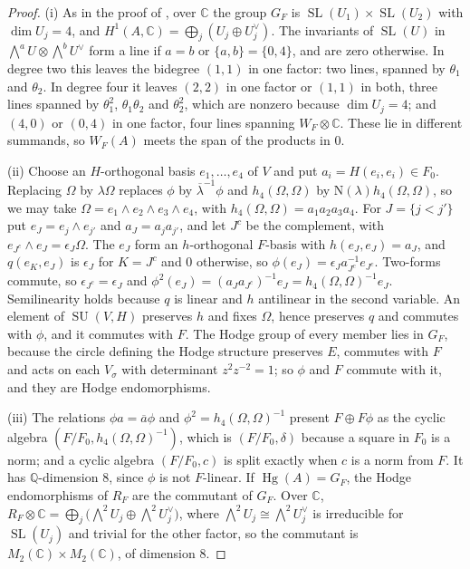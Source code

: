 \documentclass[11pt,reqno]{amsart}
\theoremstyle{plain}
\theoremstyle{definition}
\theoremstyle{remark}
\newcommand{\QQ}{\mathbb{Q}}
\newcommand{\CC}{\mathbb{C}}
\newcommand{\Nm}{\mathrm{N}}             %
\DeclareMathOperator{\Hg}{Hg}
\DeclareMathOperator{\SL}{SL}
\DeclareMathOperator{\SU}{SU}
\newcommand{\bbar}[1]{\overline{#1}}
\begin{document}
\begin{proof}
(i) As in the proof of \cite[Proposition~17.3(iii)]{paperI}, over $\CC$ the group $G_{F}$
is $\SL(U_{1})\times\SL(U_{2})$ with $\dim U_{j}=4$, and
$H^{1}(A,\CC)=\bigoplus_{j}(U_{j}\oplus U_{j}^{\vee})$. The invariants of
$\SL(U)$ in $\bigwedge^{a}U\otimes\bigwedge^{b}U^{\vee}$ form a line if $a=b$
or $\{a,b\}=\{0,4\}$, and are zero otherwise. In degree two this leaves the
bidegree $(1,1)$ in one factor: two lines, spanned by $\theta_{1}$ and
$\theta_{2}$. In degree four it leaves $(2,2)$ in one factor or $(1,1)$ in
both, three lines spanned by $\theta_{1}^{2}$, $\theta_{1}\theta_{2}$ and
$\theta_{2}^{2}$, which are nonzero because $\dim U_{j}=4$; and $(4,0)$ or
$(0,4)$ in one factor, four lines spanning $W_{F}\otimes\CC$. These lie in
different summands, so $W_{F}(A)$ meets the span of the products in $0$.

(ii) Choose an $H$-orthogonal basis $e_{1},\dots,e_{4}$ of $V$ and put
$a_{i}=H(e_{i},e_{i})\in F_{0}$. Replacing $\Omega$ by $\lambda\Omega$
replaces $\phi$ by $\bbar\lambda^{-1}\phi$ and $h_{4}(\Omega,\Omega)$ by
$\Nm(\lambda)h_{4}(\Omega,\Omega)$, so we may take
$\Omega=e_{1}\wedge e_{2}\wedge e_{3}\wedge e_{4}$, with
$h_{4}(\Omega,\Omega)=a_{1}a_{2}a_{3}a_{4}$. For $J=\{j<j'\}$ put
$e_{J}=e_{j}\wedge e_{j'}$ and $a_{J}=a_{j}a_{j'}$, and let $J^{c}$ be the
complement, with $e_{J^{c}}\wedge e_{J}=\epsilon_{J}\Omega$. The $e_{J}$ form
an $h$-orthogonal $F$-basis with $h(e_{J},e_{J})=a_{J}$, and
$q(e_{K},e_{J})$ is $\epsilon_{J}$ for $K=J^{c}$ and $0$ otherwise, so
$\phi(e_{J})=\epsilon_{J}a_{J^{c}}^{-1}e_{J^{c}}$. Two-forms commute, so
$\epsilon_{J^{c}}=\epsilon_{J}$ and
$\phi^{2}(e_{J})=(a_{J}a_{J^{c}})^{-1}e_{J}=h_{4}(\Omega,\Omega)^{-1}e_{J}$.
Semilinearity holds because $q$ is linear and $h$ antilinear in the second
variable. An element of $\SU(V,H)$ preserves $h$ and fixes $\Omega$, hence
preserves $q$ and commutes with $\phi$, and it commutes with $F$. The Hodge
group of every member lies in $G_{F}$, because the circle defining the Hodge
structure preserves $E$, commutes with $F$ and acts on each $V_{\sigma}$ with
determinant $z^{2}z^{-2}=1$; so $\phi$ and $F$ commute with it, and they are
Hodge endomorphisms.

(iii) The relations $\phi a=\bbar a\phi$ and $\phi^{2}=h_{4}(\Omega,\Omega)^{-1}$
present $F\oplus F\phi$ as the cyclic algebra
$(F/F_{0},h_{4}(\Omega,\Omega)^{-1})$, which is $(F/F_{0},\delta)$ because a
square in $F_{0}$ is a norm; and a cyclic algebra $(F/F_{0},c)$ is split
exactly when $c$ is a norm from $F$. It has $\QQ$-dimension $8$, since $\phi$
is not $F$-linear. If $\Hg(A)=G_{F}$, the Hodge endomorphisms of $R_{F}$ are
the commutant of $G_{F}$. Over $\CC$,
$R_{F}\otimes\CC=\bigoplus_{j}\bigl(\bigwedge^{2}U_{j}\oplus
\bigwedge^{2}U_{j}^{\vee}\bigr)$, where
$\bigwedge^{2}U_{j}\cong\bigwedge^{2}U_{j}^{\vee}$ is irreducible for
$\SL(U_{j})$ and trivial for the other factor, so the commutant is
$M_{2}(\CC)\times M_{2}(\CC)$, of dimension $8$.


\end{proof}
\end{document}
